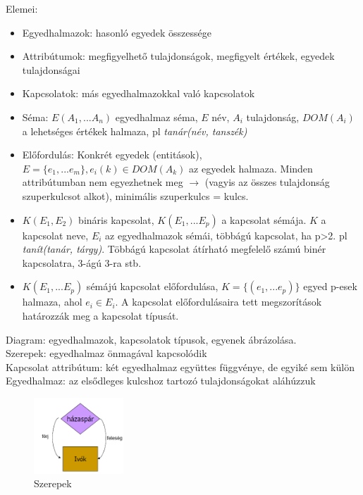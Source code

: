 \documentclass[margin=0px]{article}
\begin{document}
	Elemei:
	\begin{itemize}
		\item Egyedhalmazok: hasonló egyedek összessége
		\item Attribútumok: megfigyelhető tulajdonságok, megfigyelt értékek, egyedek tulajdonságai
		\item Kapcsolatok: más egyedhalmazokkal való kapcsolatok
		\item Séma: $E(A_1,...A_n)$ egyedhalmaz séma, $E$ név, $A_i$ tulajdonság, $DOM(A_i)$ a lehetséges értékek halmaza, pl \textit{tanár(név, tanszék)}
		\item Előfordulás: Konkrét egyedek (entitások), $E=\{e_1,...e_m\}, e_i(k) \in DOM(A_k)$ az egyedek halmaza. Minden attribútumban nem egyezhetnek meg $\to$ (vagyis az összes tulajdonság szuperkulcsot alkot), minimális szuperkulcs = kulcs.
		\item $K(E_1,E_2)$ bináris kapcsolat, $K(E_1,...E_p)$ a kapcsolat sémája. $K$ a kapcsolat neve, $E_i$ az egyedhalmazok sémái, többágú kapcsolat, ha p>2. pl \textit{tanít(tanár, tárgy)}. Többágú kapcsolat átírható megfelelő számú binér kapcsolatra, 3-ágú 3-ra stb.
		\item $K(E_1,...E_p)$ sémájú kapcsolat előfordulása, $K=\{(e_1,...e_p)\}$ egyed p-esek halmaza, ahol $e_i \in E_i$. A kapcsolat előfordulásaira tett megszorítások határozzák meg a kapcsolat típusát.
	\end{itemize}
	Diagram: egyedhalmazok, kapcsolatok típusok, egyenek ábrázolása. \\
	Szerepek: egyedhalmaz önmagával kapcsolódik \\
	Kapcsolat attribútum: két egyedhalmaz együttes függvénye, de egyiké sem külön \\
	Egyedhalmaz: az elsődleges kulcshoz tartozó tulajdonságokat aláhúzzuk \\
	
	\begin{figure}[H]
		\centering
		\includegraphics[width=0.3\textwidth]{img/ek4.png}
		\caption{Szerepek}
	\end{figure}
	
\end{document}
